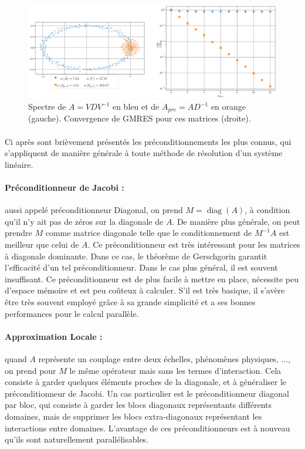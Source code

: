 		\begin{figure}
			\centering
			\includegraphics[width=\textwidth]{images/precond.png}
			\caption{Spectre de $A = VDV^{-1}$ en bleu et de $A_{pre} = AD^{-1}$ en orange (gauche). Convergence de GMRES pour ces matrices (droite).}
			\label{fig:precond}
		\end{figure}


		\paragraph{}
		Ci après sont brièvement présentés les préconditionnements les plus connus, qui s'appliquent de manière générale à toute méthode de résolution d'un système linéaire.


		\paragraph{Préconditionneur de Jacobi :}
		aussi appelé préconditionneur Diagonal, on prend $M=\operatorname{diag}\left(A\right)$, à condition qu'il n'y ait pas de zéros sur la diagonale de $A$.
		De manière plus générale, on peut prendre $M$ comme matrice diagonale telle que le conditionnement de $M^{-1}A$ est meilleur que celui de $A$.
		Ce préconditionneur est très intéressant pour les matrices à diagonale dominante.
		Dans ce cas, le théorème de Gerschgorin garantit l'efficacité d'un tel préconditionneur.
		Dans le cas plus général, il est souvent insuffisant.
		Ce préconditionneur est de plus facile à mettre en place, nécessite peu d'espace mémoire et est peu coûteux à calculer.
		S'il est très basique, il s'avère être très souvent employé grâce à sa grande simplicité et a ses bonnes performances pour le calcul parallèle.

		\paragraph{Approximation Locale :}
		quand $A$ représente un couplage entre deux échelles, phénomènes physiques, ..., on prend pour $M$ le même opérateur mais sans les termes d'interaction.
		Cela consiste à garder quelques éléments proches de la diagonale, et à généraliser le préconditionneur de Jacobi.
		Un cas particulier est le préconditionneur diagonal par bloc, qui consiste à garder les blocs diagonaux représentants différents domaines, mais de supprimer les blocs extra-diagonaux représentant les interactions entre domaines.
		L'avantage de ces préconditionneurs est à nouveau qu'ils sont naturellement parallélisables.

